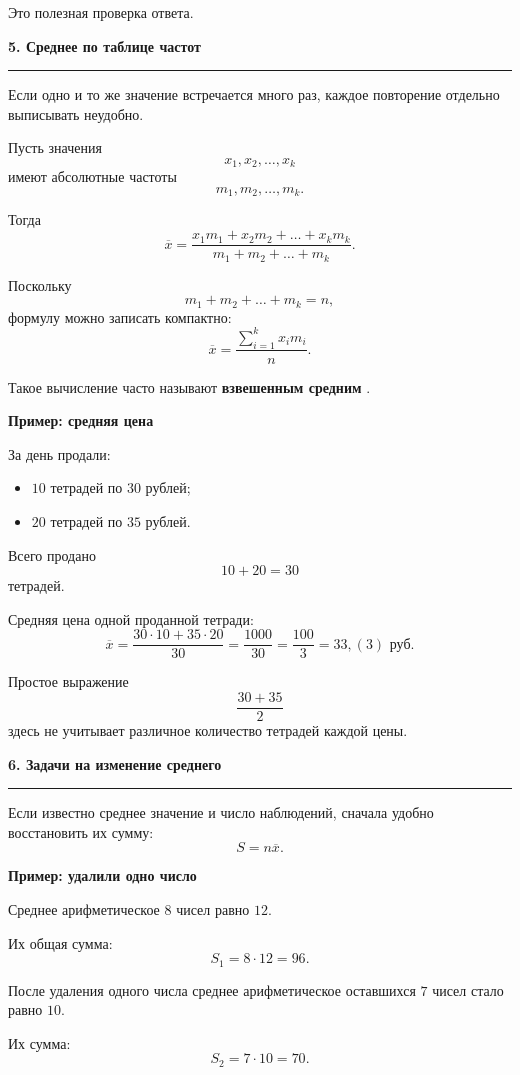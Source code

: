 \documentclass[a4paper,12pt]{article}
\newcommand{\sectiontitle}[1]{%
    \vspace{0.4em}
    {\Large\bfseries\color{darkaccent}#1\par}
    \vspace{0.25em}
    {\color{linegray}\rule{\linewidth}{0.6pt}}
    \vspace{0.7em}
}
\newcommand{\subsectiontitle}[1]{%
    \vspace{0.5em}
    {\large\bfseries\color{accent}#1\par}
    \vspace{0.25em}
}
\newcommand{\important}[1]{%
    {\color{darkaccent}\bfseries #1}
}
\begin{document}
Это полезная проверка ответа.


\sectiontitle{5. Среднее по таблице частот}

Если одно и то же значение встречается много раз, каждое повторение отдельно
выписывать неудобно.

Пусть значения
\[
x_1,x_2,\ldots,x_k
\]
имеют абсолютные частоты
\[
m_1,m_2,\ldots,m_k.
\]

Тогда
\[
\boxed{
\overline{x}
=
\frac{x_1m_1+x_2m_2+\ldots+x_km_k}
     {m_1+m_2+\ldots+m_k}
}.
\]

Поскольку
\[
m_1+m_2+\ldots+m_k=n,
\]
формулу можно записать компактно:
\[
\boxed{
\overline{x}
=
\frac{\displaystyle\sum_{i=1}^{k}x_i m_i}{n}
}.
\]

Такое вычисление часто называют \important{взвешенным средним}.

\subsectiontitle{Пример: средняя цена}

За день продали:

\begin{itemize}[leftmargin=8mm,itemsep=2pt]
    \item \(10\) тетрадей по \(30\) рублей;
    \item \(20\) тетрадей по \(35\) рублей.
\end{itemize}

Всего продано
\[
10+20=30
\]
тетрадей.

Средняя цена одной проданной тетради:
\[
\overline{x}
=
\frac{30\cdot10+35\cdot20}{30}
=
\frac{1000}{30}
=
\frac{100}{3}
=
33{,}(3)\text{ руб.}
\]

Простое выражение
\[
\frac{30+35}{2}
\]
здесь не учитывает различное количество тетрадей каждой цены.


\sectiontitle{6. Задачи на изменение среднего}

Если известно среднее значение и число наблюдений, сначала удобно восстановить
их сумму:
\[
\boxed{
S=n\overline{x}
}.
\]

\subsectiontitle{Пример: удалили одно число}

Среднее арифметическое \(8\) чисел равно \(12\).

Их общая сумма:
\[
S_1=8\cdot12=96.
\]

После удаления одного числа среднее арифметическое оставшихся \(7\) чисел стало
равно \(10\).

Их сумма:
\[
S_2=7\cdot10=70.
\]
\end{document}

